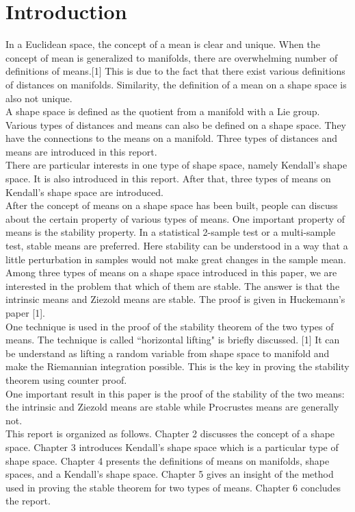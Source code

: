 \documentclass[12pt]{article}
\theoremstyle{definition}
\theoremstyle{remark}
\numberwithin{equation}{section}
\begin{document}
\section{Introduction}
In a Euclidean space, the concept of a mean is clear and unique. When the concept of mean is generalized to manifolds, there are overwhelming number of definitions of means.[1] This is due to the fact that there exist various definitions of distances on manifolds. Similarity, the definition of a mean on a shape space is also not unique.\\[0.2cm]
\indent A shape space is defined as the quotient from a manifold with a Lie group. Various types of distances and means can also be defined on a shape space. They have the connections to the means on a manifold. Three types of distances and means are introduced in this report. \\[0.2cm]
\indent There are particular interests in one type of shape space, namely Kendall's shape space. It is also introduced in this report. After that, three types of means on Kendall's shape space are introduced. \\[0.2cm]
\indent After the concept of means on a shape space has been built, people can discuss about the certain property of various types of means. One important property of means is the stability property. In a statistical 2-sample test or a multi-sample test, stable means are preferred. Here stability can be understood in a way that a little perturbation in samples would not make great changes in the sample mean. Among three types of means on a shape space introduced in this paper, we are interested in the problem that which of them are stable. The answer is that the intrinsic means and Ziezold means are stable. The proof is given in Huckemann's paper [1]. \\[0.2cm]
\indent One technique is used in the proof of the stability theorem of the two types of means. The technique is called ``horizontal lifting" is briefly discussed. [1] It can be understand as lifting a random variable from shape space to manifold and make the Riemannian integration possible. This is the key in proving the stability theorem using counter proof. \\[0.2cm]
\indent One important result in this paper is the proof of the stability of the two means: the intrinsic and Ziezold means are stable while Procrustes means are generally not.\\[0.2cm]
\indent This report is organized as follows. Chapter 2 discusses the concept of a shape space. Chapter 3 introduces Kendall's shape space which is a particular type of shape space. Chapter 4 presents the definitions of means on manifolds, shape spaces, and a Kendall's shape space. Chapter 5 gives an insight of the method used in proving the stable theorem for two types of means. Chapter 6 concludes the report.
\end{document}
